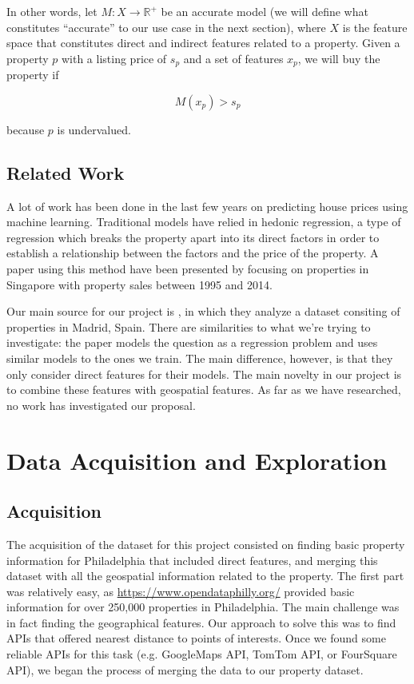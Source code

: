 \documentclass[11pt,a4paper]{article}
\begin{document}
\medskip

In other words, let $M: X \to \mathbb{R}^+$ be an accurate model (we will
define what constitutes ``accurate'' to our use case in the next section),
where $X$ is the feature space that constitutes direct and indirect
features related to a property. Given a property $p$ with a listing price of $s_p$ and a set of features $x_p$, we will buy the property if

\begin{equation}
  M(x_p) > s_p
\end{equation}

because $p$ is undervalued.

\subsection{Related Work}

A lot of work has been done in the last few years on predicting house prices
using machine learning. Traditional models have relied in hedonic
regression, a type of regression which breaks the property apart into its direct factors in order to establish
a relationship between the factors and the price of the property. A paper using this method have been 
presented by \cite{jiang2014new} focusing on properties in Singapore with property sales between 1995 and 2014.

\medskip

Our main source for our project is \cite{bergadano2019learning},
in which they analyze a dataset consiting of properties in Madrid, Spain.
There are similarities to what we're trying to investigate: the paper models
the question as a regression problem and uses similar models to the ones we train. 
The main difference, however, is that they only consider direct features for their models. 
The main novelty in our project is to combine these features with geospatial features.
As far as we have researched, no work has investigated our proposal.


\section{Data Acquisition and Exploration}

\subsection{Acquisition}

The acquisition of the dataset for this project consisted on finding basic property
information for Philadelphia that included direct features, and merging this dataset
with all the geospatial information related to the property. The first part was
relatively easy, as \url{https://www.opendataphilly.org/} provided basic information
for over 250,000 properties in Philadelphia. The main challenge was in fact finding
the geographical features. Our approach to solve this was to find APIs that offered
nearest distance to points of interests. Once we found some reliable APIs for this task
(e.g. GoogleMaps API, TomTom API, or FourSquare API), we began the process of merging
the data to our property dataset.
\end{document}
